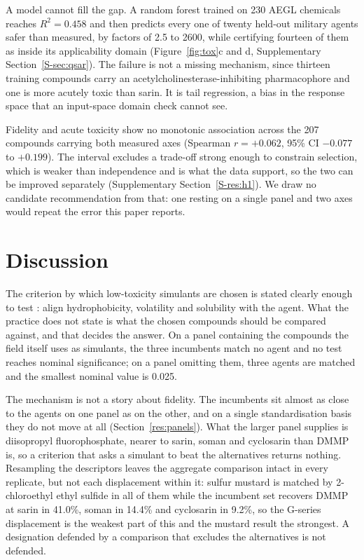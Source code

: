 \documentclass[1p,times]{elsarticle}
\begin{document}
A model cannot fill the gap. A random forest trained on 230 AEGL chemicals
reaches $R^{2}=0.458$ and then predicts every one of twenty held-out military
agents safer than measured, by factors of 2.5 to 2600, while certifying fourteen
of them as inside its applicability domain (Figure~\ref{fig:tox}c and d,
Supplementary Section~\ref{S-sec:qsar}). The failure is not a missing mechanism, since
thirteen training compounds carry an acetylcholinesterase-inhibiting
pharmacophore and one is more acutely toxic than sarin. It is tail regression, a bias in
the response space that an input-space domain check cannot see.

Fidelity and acute toxicity show no monotonic association across the 207
compounds carrying both measured axes (Spearman $r=+0.062$, 95\% CI $-0.077$ to
$+0.199$). The interval excludes a trade-off strong enough to constrain
selection, which is weaker than independence and is what the data support, so
the two can be improved separately
(Supplementary Section~\ref{S-res:h1}). We draw no candidate recommendation from
that: one resting on a single panel and two axes would repeat the error this
paper reports.

\section{Discussion}

The criterion by which low-toxicity simulants are chosen is stated clearly
enough to test \cite{webb2025}: align hydrophobicity, volatility and solubility
with the agent. What the practice does not state is what the chosen compounds
should be compared against, and that decides the answer. On a panel containing
the compounds the field itself uses as simulants, the three incumbents match no
agent and no test reaches nominal significance; on a panel omitting them, three
agents are matched and the smallest nominal value is 0.025.

The mechanism is not a story about fidelity. The incumbents sit almost as close
to the agents on one panel as on the other, and on a single standardisation
basis they do not move at all (Section~\ref{res:panels}). What the larger panel supplies is
diisopropyl fluorophosphate, nearer to sarin, soman and cyclosarin than DMMP is,
so a criterion that asks a simulant to beat the alternatives returns nothing.
Resampling the descriptors leaves the aggregate comparison intact in every
replicate, but not each displacement within it: sulfur mustard is matched by
2-chloroethyl ethyl sulfide in all of them while the incumbent set recovers DMMP
at sarin in 41.0\%, soman in 14.4\% and cyclosarin in 9.2\%, so the G-series
displacement is the weakest part of this and the mustard result the strongest. A designation
defended by a comparison that excludes the alternatives is not defended.
\end{document}

